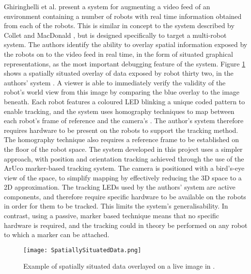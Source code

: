 Ghiringhelli et al. \cite{Ghiringhelli:2014} present a system for augmenting a video feed of an environment containing a number of robots with real time information obtained from each of the robots. This is similar in concept to the system described by Collet and MacDonald \cite{Collet:2006}, but is designed specifically to target a multi-robot system. The authors identify the ability to overlay spatial information exposed by the robots on to the video feed in real time, in the form of situated graphical representations, as the most important debugging feature of the system. Figure \ref{fig:SpatiallySituated} shows a spatially situated overlay of data exposed by robot thirty two, in the authors' system \cite{Ghiringhelli:2014}. A viewer is able to immediately verify the validity of the robot's world view from this image by comparing the blue overlay to the image beneath. Each robot features a coloured LED blinking a unique coded pattern to enable tracking, and the system uses homography techniques to map between each robot's frame of reference and the camera's \cite{Ghiringhelli:2014}. The author's system therefore requires hardware to be present on the robots to support the tracking method. The homography technique also requires a reference frame to be established on the floor of the robot space. The system developed in this project uses a simpler approach, with position and orientation tracking achieved through the use of the ArUco \cite{Garrido:2014} marker-based tracking system. The camera is positioned with a bird's-eye view of the space, to simplify mapping by effectively reducing the 3D space to a 2D approximation. The tracking LEDs used by the authors' system \cite{Ghiringhelli:2014} are active components, and therefore require specific hardware to be available on the robots in order for them to be tracked. This limits the system's generalisability. In contrast, using a passive, marker based technique means that no specific hardware is required, and the tracking could in theory be performed on any robot to which a marker can be attached.

\begin{figure}
	\begin{center}
	\texttt{[image: SpatiallySituatedData.png]}
	\decoRule
	\caption[Spatially situation data overlay. Garrido et al. \cite{Ghiringhelli:2014}]{Example of spatially situated data overlayed on a live image in \cite{Ghiringhelli:2014}.}
	\label{fig:SpatiallySituated}
	\end{center}
\end{figure}

